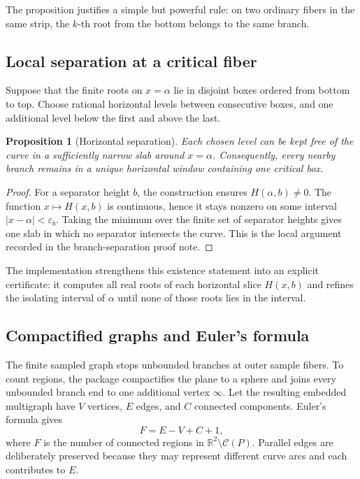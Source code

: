\documentclass[11pt,a4paper]{article}
\newtheorem{proposition}[definition]{Proposition}
\newcommand{\RR}{\mathbb{R}}
\newcommand{\Curve}{\mathcal{C}}
\begin{document}
The proposition justifies a simple but powerful rule: on two ordinary fibers
in the same strip, the $k$-th root from the bottom belongs to the same branch.

\subsection{Local separation at a critical fiber}

Suppose that the finite roots on $x=\alpha$ lie in disjoint boxes ordered from
bottom to top. Choose rational horizontal levels between consecutive boxes,
and one additional level below the first and above the last.

\begin{proposition}[Horizontal separation]
Each chosen level can be kept free of the curve in a sufficiently narrow slab
around $x=\alpha$. Consequently, every nearby branch remains in a unique
horizontal window containing one critical box.
\end{proposition}

\begin{proof}
For a separator height $b$, the construction ensures $H(\alpha,b)\ne0$.
The function $x\mapsto H(x,b)$ is continuous, hence it stays nonzero on some
interval $|x-\alpha|<\varepsilon_b$. Taking the minimum over the finite set of
separator heights gives one slab in which no separator intersects the curve.
This is the local argument recorded in the branch-separation proof note.
\end{proof}

The implementation strengthens this existence statement into an explicit
certificate: it computes all real roots of each horizontal slice $H(x,b)$ and
refines the isolating interval of $\alpha$ until none of those roots lies in
the interval.

\subsection{Compactified graphs and Euler's formula}

The finite sampled graph stops unbounded branches at outer sample fibers. To
count regions, the package compactifies the plane to a sphere and joins every
unbounded branch end to one additional vertex $\infty$. Let the resulting
embedded multigraph have $V$ vertices, $E$ edges, and $C$ connected
components. Euler's formula gives
\begin{equation}
  F=E-V+C+1,
  \label{eq:euler-regions}
\end{equation}
where $F$ is the number of connected regions in
$\RR^2\setminus\Curve(P)$. Parallel edges are deliberately preserved because
they may represent different curve arcs and each contributes to $E$.
\end{document}
